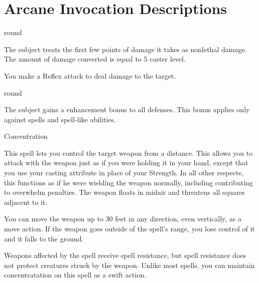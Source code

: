 \section{Arcane Invocation Descriptions}

 round
\begin{spelleffect}
    The subject treats the first few points of damage it takes as nonlethal damage. The amount of damage converted is equal to 5 \add caster level.
\end{spelleffect}

\begin{spelleffect}
    You make a Reflex attack to deal damage to the target.
\end{spelleffect}

 round
\begin{spelleffect}
    The subject gains a  enhancement bonus to all defenses. \bonusscalingdescription This bonus applies only against spells and spell-like abilities.
\end{spelleffect}

\spelldur Concentration
\begin{spelleffect}
    This spell lets you control the target weapon from a distance. This allows you to attack with the weapon just as if you were holding it in your hand, except that you use your casting attribute in place of your Strength. In all other respects, this functions as if he were wielding the weapon normally, including contributing to overwhelm penalties. The weapon floats in midair and threatens all squares adjacent to it.

    You can move the weapon up to 30 feet in any direction, even vertically, as a move action. If the weapon goes outside of the spell's range, you lose control of it and it falls to the ground.
\end{spelleffect}
\begin{spellnotes}
    Weapons affected by the spell receive spell resistance, but spell resistance does not protect creatures struck by the weapon. Unlike most spells, you can maintain concentratation on this spell as a swift action.
\end{spellnotes}

